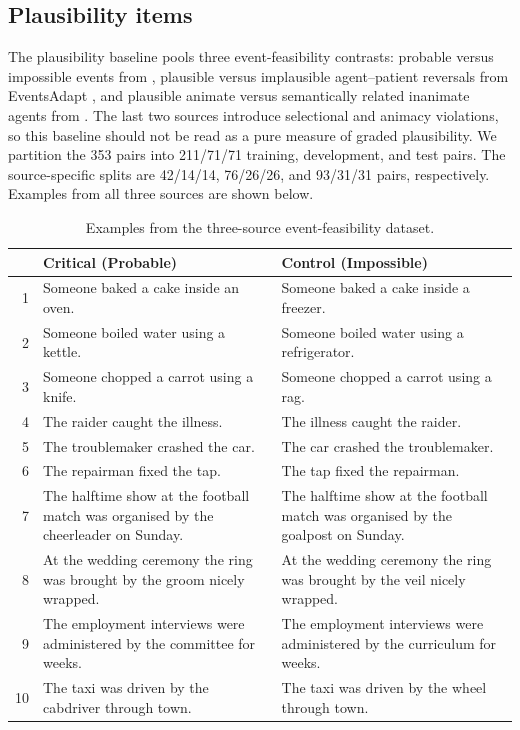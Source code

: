 \subsection{Plausibility items}
\label{app:plausibility-examples}

The plausibility baseline pools three event-feasibility contrasts: probable
versus impossible events from \citet{hu-etal-2025-shades}, plausible versus
implausible agent--patient reversals from EventsAdapt
\citep{kauf-etal-2023-event}, and plausible animate versus semantically related
inanimate agents from \citet{vega-mendoza-etal-2021-concurrent}. The last two
sources introduce selectional and animacy violations, so this baseline should
not be read as a pure measure of graded plausibility. We partition the 353
pairs into 211/71/71 training, development, and test pairs. The source-specific
splits are 42/14/14, 76/26/26, and 93/31/31 pairs, respectively. Examples from
all three sources are shown below.

\begin{table}[t]
\centering
\footnotesize
\setlength{\tabcolsep}{4pt}
\renewcommand{\arraystretch}{1.08}
\caption{Examples from the three-source event-feasibility dataset.}
\label{tab:plausibility-examples}
\begin{tabular}{@{}r >{\raggedright\arraybackslash}p{} >{\raggedright\arraybackslash}p{}@{}}
\toprule
& Critical (Probable) & Control (Impossible) \\
\midrule
1 & Someone baked a cake inside an oven. & Someone baked a cake inside a freezer. \\
2 & Someone boiled water using a kettle. & Someone boiled water using a refrigerator. \\
3 & Someone chopped a carrot using a knife. & Someone chopped a carrot using a rag. \\
4 & The raider caught the illness. & The illness caught the raider. \\
5 & The troublemaker crashed the car. & The car crashed the troublemaker. \\
6 & The repairman fixed the tap. & The tap fixed the repairman. \\
7 & The halftime show at the football match was organised by the cheerleader on Sunday. & The halftime show at the football match was organised by the goalpost on Sunday. \\
8 & At the wedding ceremony the ring was brought by the groom nicely wrapped. & At the wedding ceremony the ring was brought by the veil nicely wrapped. \\
9 & The employment interviews were administered by the committee for weeks. & The employment interviews were administered by the curriculum for weeks. \\
10 & The taxi was driven by the cabdriver through town. & The taxi was driven by the wheel through town. \\
\bottomrule
\end{tabular}
\end{table}
